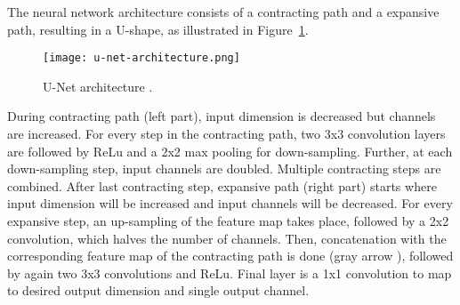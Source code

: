 The neural network architecture consists of a contracting path and a expansive path,
resulting in a U-shape, as illustrated in Figure~\ref{fig:u-net-architectue}.

\begin{figure}[H]
  \centering
  \texttt{[image: u-net-architecture.png]}
  \caption{U-Net architecture \cite[p 2, Fig. 1]{unet-tomography}.}
    \label{fig:u-net-architectue}
\end{figure}


During contracting path (left part), input dimension is decreased but channels are increased.
For every step in the contracting path, two 3x3 convolution layers are followed by ReLu
and a 2x2 max pooling for down-sampling. Further, at each down-sampling step, input channels are doubled.
Multiple contracting steps are combined. After last contracting step, expansive path (right part) starts
where input dimension will be increased and input channels will be decreased.
For every expansive step, an up-sampling of the feature map takes place, followed by a 2x2 convolution, 
which halves the number of channels. Then, concatenation with the corresponding feature
map of the contracting path is done (gray arrow ), followed by again two 3x3 convolutions and ReLu.
Final layer is a 1x1 convolution to map to desired output dimension and single output channel.

